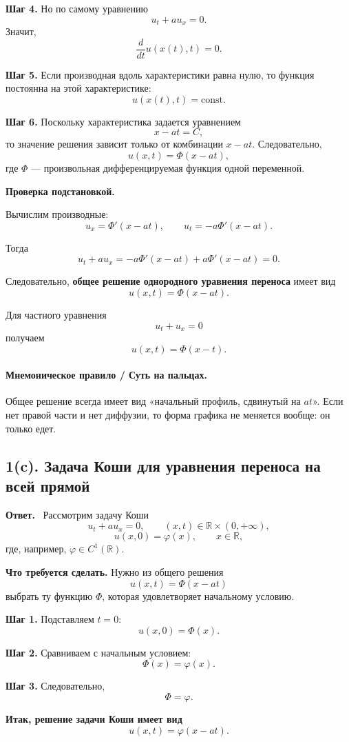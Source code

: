 \documentclass[a4paper,12pt]{article}
\newcommand{\R}{\mathbb{R}}
\newcommand{\Answer}{\textbf{Ответ.}\ }
\begin{document}
\textbf{Шаг 4.} Но по самому уравнению
\[
u_t+a u_x=0.
\]
Значит,
\[
\frac{d}{dt}u(x(t),t)=0.
\]

\textbf{Шаг 5.} Если производная вдоль характеристики равна нулю, то функция постоянна на этой характеристике:
\[
u(x(t),t)=\mathrm{const}.
\]

\textbf{Шаг 6.} Поскольку характеристика задается уравнением
\[
x-at=C,
\]
то значение решения зависит только от комбинации $x-at$. Следовательно,
\[
u(x,t)=\Phi(x-at),
\]
где $\Phi$ --- произвольная дифференцируемая функция одной переменной.

\textbf{Проверка подстановкой.}

Вычислим производные:
\[
u_x=\Phi'(x-at),
\qquad
u_t=-a\Phi'(x-at).
\]

Тогда
\[
u_t+a u_x=-a\Phi'(x-at)+a\Phi'(x-at)=0.
\]

Следовательно, \textbf{общее решение однородного уравнения переноса} имеет вид
\[
u(x,t)=\Phi(x-at).
\]

Для частного уравнения
\[
u_t+u_x=0
\]
получаем
\[
u(x,t)=\Phi(x-t).
\]

\paragraph{Мнемоническое правило / Суть на пальцах.}
Общее решение всегда имеет вид «начальный профиль, сдвинутый на $at$». Если нет правой части и нет диффузии, то форма графика не меняется вообще: он только едет.

\subsection*{1(c). Задача Коши для уравнения переноса на всей прямой}

\Answer
Рассмотрим задачу Коши
\[
u_t+a u_x=0,
\qquad (x,t)\in \R\times(0,+\infty),
\]
\[
u(x,0)=\varphi(x),
\qquad x\in\R,
\]
где, например, $\varphi\in C^1(\R)$.

\textbf{Что требуется сделать.} Нужно из общего решения
\[
u(x,t)=\Phi(x-at)
\]
выбрать ту функцию $\Phi$, которая удовлетворяет начальному условию.

\textbf{Шаг 1.} Подставляем $t=0$:
\[
u(x,0)=\Phi(x).
\]

\textbf{Шаг 2.} Сравниваем с начальным условием:
\[
\Phi(x)=\varphi(x).
\]

\textbf{Шаг 3.} Следовательно,
\[
\Phi=\varphi.
\]

\textbf{Итак, решение задачи Коши имеет вид}
\[
u(x,t)=\varphi(x-at).
\]
\end{document}
